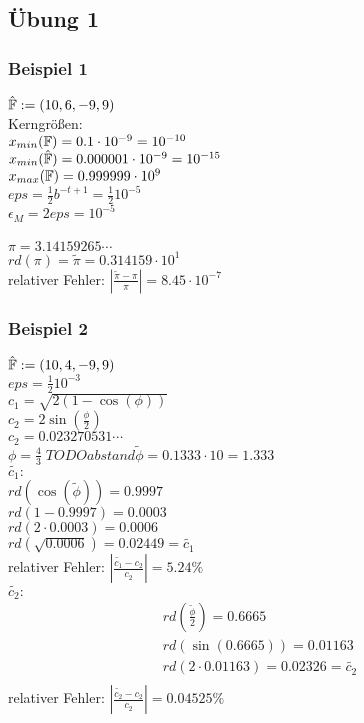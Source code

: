 \subsection{Übung 1}
\subsubsection{Beispiel 1}
$ \hat{\mathbb{F}} := (10,6,-9,9) $ \\
Kerngrößen:\\
$ x_{min}(\mathbb{F}) = 0.1 \cdot 10^{-9} = 10^{-10} $ \\
$ x_{min}(\hat{\mathbb{F}}) = 0.000001 \cdot 10^{-9} = 10^{-15} $ \\
$ x_{max}(\mathbb{F}) = 0.999999 \cdot 10^{9} $ \\
$ eps = \frac{1}{2} b^{-t + 1} = \frac{1}{2} 10^{-5} $ \\
$ \epsilon_{M} = 2eps = 10^{-5} $ \\
\\
$ \pi = 3.14159265\cdots $ \\
$ rd(\pi) = \tilde{\pi} = 0.314159 \cdot 10^1 $ \\
relativer Fehler: $ | \frac{\tilde{\pi} - \pi}{\pi} | = 8.45 \cdot 10^{-7} $

\subsubsection{Beispiel 2}
$ \hat{\mathbb{F}} := (10,4,-9,9) $ \\
$ eps = \frac{1}{2} 10^{-3} $ \\
$ c_1 = \sqrt{2(1-\cos(\phi))} $ \\
$ c_2 = 2 \sin(\frac{\phi}{2}) $ \\
$ c_2 = 0.023270531\cdots $ \\
$ \phi= \frac{4}{3} \;TODOabstand \tilde{\phi} = 0.1333 \cdot 10 = 1.333 $ \\

$ \tilde{c_1}: $ \\
$ rd({\cos}(\tilde{\phi})) = 0.9997 $ \\
$ rd(1 - 0.9997) = 0.0003 $ \\
$ rd(2 \cdot 0.0003) = 0.0006 $ \\
$ rd(\sqrt{0.0006}) = 0.02449 = \tilde{c_1} $ \\
relativer Fehler: $ | \frac{\tilde{c_1} - c_2}{c_2} | = 5.24\% $ \\

$ \tilde{c_2}: $ \\
\begin{equation*}
\begin{split}
  rd(\frac{\tilde{\phi}}{2}) = 0.6665 \\
  rd(\sin(0.6665)) = 0.01163 \\
  rd(2 \cdot 0.01163) = 0.02326 = \tilde{c_2} \\
\end{split}
\end{equation*}
relativer Fehler: $ | \frac{\tilde{c_2} - c_2}{c_2} | = 0.04525\% $ \\

